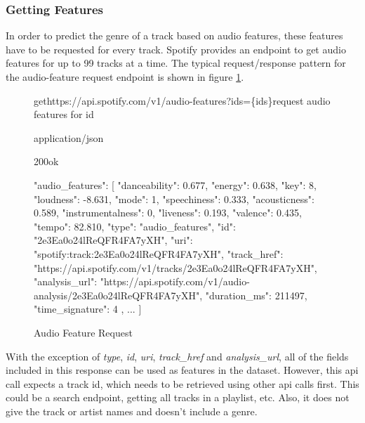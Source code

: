 \subsubsection{Getting Features}

In order to predict the genre of a track based on audio features, these features have to be requested
for every track. Spotify provides an endpoint to get audio features for up to 99 tracks at a time.
The typical request/response pattern for the audio-feature request endpoint is shown in figure \ref{fig:Audio Feature Request}.

\begin{figure}[H]
    \caption{Audio Feature Request}
	\label{fig:Audio Feature Request}
\begin{apiRoute}{get}{https://api.spotify.com/v1/audio-features?ids=\{ids\}}{request audio features for id}
    \methodJson
    \begin{routeParameter}
    \end{routeParameter}
    \begin{routeResponse}{application/json}
        \begin{routeResponseItem}{200}{ok}
            \begin{routeResponseItemBody}
{
    "audio_features": [
        {
            "danceability": 0.677,
            "energy": 0.638,
            "key": 8,
            "loudness": -8.631,
            "mode": 1,
            "speechiness": 0.333,
            "acousticness": 0.589,
            "instrumentalness": 0,
            "liveness": 0.193,
            "valence": 0.435,
            "tempo": 82.810,
            "type": "audio_features",
            "id": "2e3Ea0o24lReQFR4FA7yXH",
            "uri": "spotify:track:2e3Ea0o24lReQFR4FA7yXH",
            "track_href": "https://api.spotify.com/v1/tracks/2e3Ea0o24lReQFR4FA7yXH",
            "analysis_url": "https://api.spotify.com/v1/audio-analysis/2e3Ea0o24lReQFR4FA7yXH",
            "duration_ms": 211497,
            "time_signature": 4
        },
        ...
    ]
}
            \end{routeResponseItemBody}
        \end{routeResponseItem}
    \end{routeResponse}
\end{apiRoute}
\end{figure}

With the exception of \emph{type}, \emph{id}, \emph{uri}, \emph{track\_href} and \emph{analysis\_url}, all of the fields included in this response
can be used as features in the dataset. However, this api call expects a track id, which needs to be retrieved using
other api calls first. This could be a search endpoint, getting all tracks in a playlist, etc.
Also, it does not give the track or artist names and doesn't include a genre.

